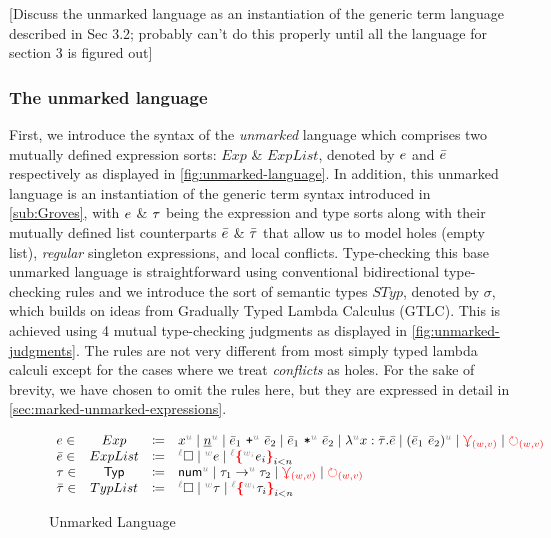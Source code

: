 [Discuss the unmarked language as an instantiation of the generic term language described in Sec 3.2; probably can't do this properly until all the language for section 3 is figured out]

\subsubsection{The unmarked language}
\label{sub:unmarked-lang}
First, we introduce the syntax of the \emph{unmarked} language which comprises two mutually defined expression sorts: $Exp$ \& $ExpList$, denoted by $e$ and $\bar{e}$ respectively as displayed in \autoref{fig:unmarked-language}. In addition, this unmarked language is an instantiation of the generic term syntax introduced in \autoref{sub:Groves}, with $e$ \& $\tau$ being the expression and type sorts along with their mutually defined list counterparts $\bar{e}$ \& $\bar{\tau}$ that allow us to model holes (empty list), \emph{regular} singleton expressions, and local conflicts. Type-checking this base unmarked language is straightforward using conventional bidirectional type-checking rules and we introduce the sort of semantic types $STyp$, denoted by $\sigma$, which builds on ideas from  Gradually Typed Lambda Calculus (GTLC). This is achieved using 4 mutual type-checking judgments as displayed in \autoref{fig:unmarked-judgments}. The rules are not very different from most simply typed lambda calculi except for the cases where we treat \emph{conflicts} as holes. For the sake of brevity, we have chosen to omit the rules here, but they are expressed in detail in \autoref{sec:marked-unmarked-expressions}. 

\begin{figure}
    \judgbox{\ctxSynTypeU{\ctx}{\EMV}{\sigma}} 
    \judgbox{\ctxSynTypeU{\ctx}{\ELV}{\sigma}}
    \judgbox{\ctxAnaTypeU{\ctx}{\EMV}{\sigma}} 
    \judgbox{\ctxAnaTypeU{\ctx}{\ELV}{\sigma}}
    \centering
    \label{fig:unmarked-judgments}
\end{figure}

\begin{figure}
    \[
    \begin{array}{lclll}
     \EMV \in & Exp & \coloneqq & 
        \var{x}
        \mid  \num 
        \mid \plus{\ELV_1}{\ELV_2} 
        \mid \mult{\ELV_1}{\ELV_2}
        \mid \lam{x}{\TLMV}{\ELV}
        \mid \app{\ELV_1}{\ELV_2}
        \mid \multiref
        \mid \uniref \\
     \ELV \in & ExpList & \coloneqq & 
        \ehole
        \mid \lexp{\EMV} 
        \mid \conflict{\EMV} \\
    \TMV \in & \Typ & \coloneqq & 
        \tnum 
        \mid \tarrow 
        \mid \multiref 
        \mid \uniref \\ 
    \TLMV \in & TypList & \coloneqq &
        \ehole
        \mid \lexp{\TMV}
        \mid \conflict{\TMV} \\
    \end{array}
    \]
    \centering
    \caption{Unmarked Language}
    \label{fig:unmarked-language}
\end{figure}

